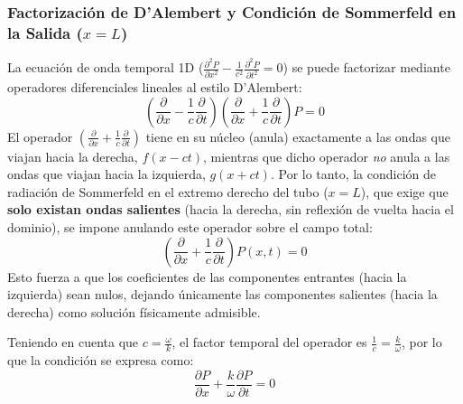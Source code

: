 \documentclass[11pt,letterpaper]{article}
\begin{document}
\subsubsection{Factorización de D'Alembert y Condición de Sommerfeld en la Salida ($x = L$)}
La ecuación de onda temporal 1D ($\frac{\partial^2 P}{\partial x^2} - \frac{1}{c^2} \frac{\partial^2 P}{\partial t^2} = 0$) se puede factorizar mediante operadores diferenciales lineales al estilo D'Alembert:
\begin{equation}
    \left( \frac{\partial}{\partial x} - \frac{1}{c} \frac{\partial}{\partial t} \right) \left( \frac{\partial}{\partial x} + \frac{1}{c} \frac{\partial}{\partial t} \right) P = 0
\end{equation}
El operador $\left(\frac{\partial}{\partial x} + \frac{1}{c}\frac{\partial}{\partial t}\right)$ tiene en su núcleo (anula) exactamente a las ondas que viajan hacia la derecha, $f(x-ct)$, mientras que dicho operador \textit{no} anula a las ondas que viajan hacia la izquierda, $g(x+ct)$. Por lo tanto, la condición de radiación de Sommerfeld en el extremo derecho del tubo ($x = L$), que exige que \textbf{solo existan ondas salientes} (hacia la derecha, sin reflexión de vuelta hacia el dominio), se impone anulando este operador sobre el campo total:
\begin{equation}
    \left( \frac{\partial}{\partial x} + \frac{1}{c} \frac{\partial}{\partial t} \right) P(x,t) = 0
\end{equation}
Esto fuerza a que los coeficientes de las componentes entrantes (hacia la izquierda) sean nulos, dejando únicamente las componentes salientes (hacia la derecha) como solución físicamente admisible.

Teniendo en cuenta que $c = \frac{\omega}{k}$, el factor temporal del operador es $\frac{1}{c} = \frac{k}{\omega}$, por lo que la condición se expresa como:
\begin{equation}
    \frac{\partial P}{\partial x} + \frac{k}{\omega} \frac{\partial P}{\partial t} = 0
\end{equation}
\end{document}
